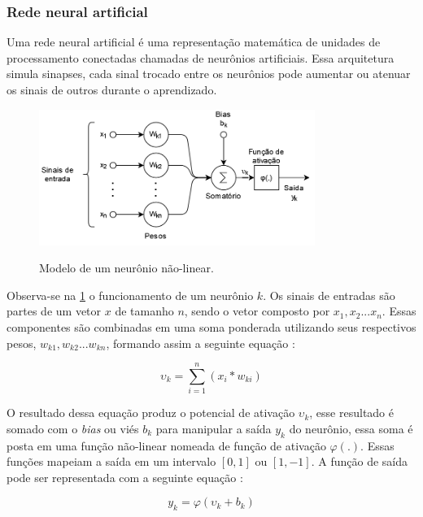 \subsubsection{Rede neural artificial}

Uma rede neural artificial é uma representação matemática de unidades de processamento conectadas chamadas de neurônios artificiais. Essa arquitetura simula sinapses, cada sinal trocado entre os neurônios pode aumentar ou atenuar os sinais de outros durante o aprendizado\cite{ml_and_dp}.
\begin{figure}[ht]
	\centering
	\caption{Modelo de um neurônio não-linear.}
	\includegraphics[width=0.8\textwidth]{figures/neuronio.png}
	\label{fig:neuronio}
\end{figure}

Observa-se na \cref{fig:neuronio} o funcionamento de um neurônio $k$. Os sinais de entradas são partes de um vetor $x$ de tamanho $n$, sendo o vetor composto por $x_1, x_2 ... x_n$. Essas componentes são combinadas em uma soma ponderada utilizando seus respectivos pesos, $w_{k1}, w_{k2}...w_{kn}$, formando assim a seguinte equação  :

\begin{equation}
	\upsilon_k = \sum_{i=1}^n (x_i * w_{ki})
\end{equation}

O resultado dessa equação produz o potencial de ativação $\upsilon_k$, esse resultado é somado com o \textit{bias} ou viés $b_k$ para manipular a saída $y_k$ do neurônio, essa soma é posta em uma função não-linear nomeada de função de ativação $\varphi(.)$. Essas funções mapeiam a saída em um intervalo $[0, 1]$ ou $[1, -1]$. A função de saída pode ser representada com a seguinte equação :

\begin{equation}
	y_k = \varphi(\upsilon_k + b_k)
\end{equation}

